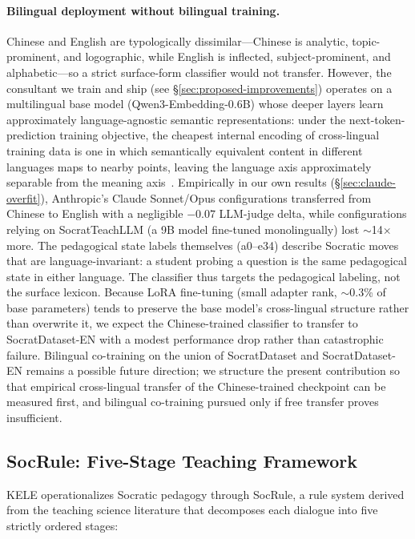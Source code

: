 \documentclass[11pt]{article}
\begin{document}
\paragraph{Bilingual deployment without bilingual training.} Chinese and English are typologically dissimilar---Chinese is analytic, topic-prominent, and logographic, while English is inflected, subject-prominent, and alphabetic---so a strict surface-form classifier would not transfer. However, the consultant we train and ship (see \S\ref{sec:proposed-improvements}) operates on a multilingual base model (Qwen3-Embedding-0.6B) whose deeper layers learn approximately language-agnostic semantic representations: under the next-token-prediction training objective, the cheapest internal encoding of cross-lingual training data is one in which semantically equivalent content in different languages maps to nearby points, leaving the language axis approximately separable from the meaning axis~\citep{pires2019multilingual,wu2019beto,conneau2020unsupervised}. Empirically in our own results (\S\ref{sec:claude-overfit}), Anthropic's Claude Sonnet/Opus configurations transferred from Chinese to English with a negligible $-0.07$ LLM-judge delta, while configurations relying on SocratTeachLLM (a 9B model fine-tuned monolingually) lost $\sim$14$\times$ more. The pedagogical state labels themselves (a0--e34) describe Socratic moves that are language-invariant: a student probing a question is the same pedagogical state in either language. The classifier thus targets the pedagogical labeling, not the surface lexicon. Because LoRA fine-tuning (small adapter rank, $\sim$0.3\% of base parameters) tends to preserve the base model's cross-lingual structure rather than overwrite it, we expect the Chinese-trained classifier to transfer to SocratDataset-EN with a modest performance drop rather than catastrophic failure. Bilingual co-training on the union of SocratDataset and SocratDataset-EN remains a possible future direction; we structure the present contribution so that empirical cross-lingual transfer of the Chinese-trained checkpoint can be measured first, and bilingual co-training pursued only if free transfer proves insufficient.

\subsection{SocRule: Five-Stage Teaching Framework}

KELE operationalizes Socratic pedagogy through SocRule, a rule system derived from the teaching science literature \citep{trowbridge2011teaching} that decomposes each dialogue into five strictly ordered stages:
\end{document}
